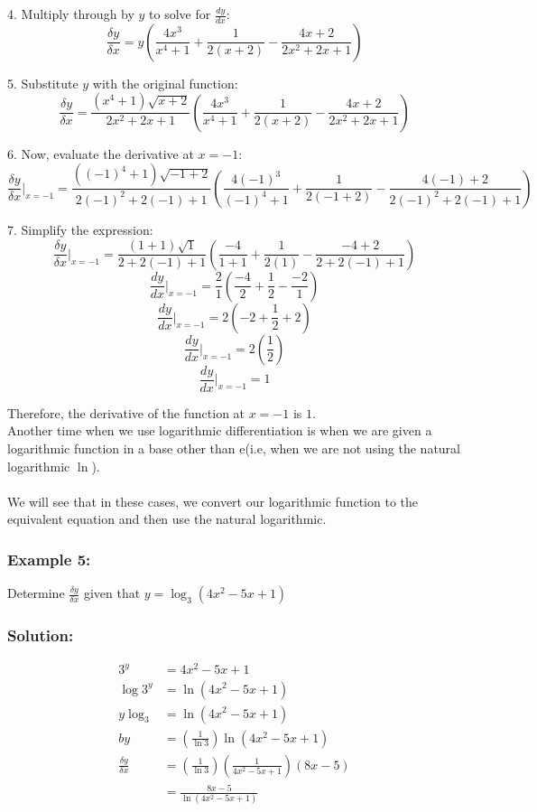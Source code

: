 \documentclass{article}
\begin{document}
4. Multiply through by $y$ to solve for $\frac{dy}{dx}$:
   $$\frac{\delta y}{\delta x} = y\left(\frac{4x^3}{x^4+1} + \frac{1}{2(x+2)} - \frac{4x+2}{2x^2+2x+1}\right)$$

5. Substitute $y$ with the original function:
   $$\frac{\delta y}{\delta x} = \frac{(x^4+1)\sqrt{x+2}}{2x^2+2x+1}\left(\frac{4x^3}{x^4+1} + \frac{1}{2(x+2)} - \frac{4x+2}{2x^2+2x+1}\right)$$

6. Now, evaluate the derivative at $x=-1$:
   $$\frac{\delta y}{\delta x}\bigg|_{x=-1} = \frac{((-1)^4+1)\sqrt{-1+2}}{2(-1)^2+2(-1)+1}\left(\frac{4(-1)^3}{(-1)^4+1} + \frac{1}{2(-1+2)} - \frac{4(-1)+2}{2(-1)^2+2(-1)+1}\right)$$

7. Simplify the expression:
   $$\frac{\delta y}{\delta x}\bigg|_{x=-1} = \frac{(1+1)\sqrt{1}}{2+2(-1)+1}\left(\frac{-4}{1+1} + \frac{1}{2(1)} - \frac{-4+2}{2+2(-1)+1}\right)$$
   $$\frac{dy}{dx}\bigg|_{x=-1} = \frac{2}{1}\left(\frac{-4}{2} + \frac{1}{2} - \frac{-2}{1}\right)$$
   $$\frac{dy}{dx}\bigg|_{x=-1} = 2\left(-2 + \frac{1}{2} + 2\right)$$
   $$\frac{dy}{dx}\bigg|_{x=-1} = 2\left(\frac{1}{2}\right)$$
   $$\frac{dy}{dx}\bigg|_{x=-1} = 1$$

Therefore, the derivative of the function at $x=-1$ is $1$.\\
Another time when we use logarithmic differentiation is when we are given a logarithmic function in a base other than e(i.e, when we are not using the natural logarithmic $\ln$).\\\\
We will see that in these cases, we convert our logarithmic function to the equivalent equation and then use the natural logarithmic.
\subsubsection*{Example 5: }
Determine $\frac{\delta y}{\delta x}$ given that $y=\log_3(4x^2-5x+1)$
\subsubsection*{Solution: }
\begin{align*}
    3^y&=4x^2-5x+1\\
    \log 3^y&=\ln(4x^2-5x+1)\\
    y\log_3&=\ln(4x^2-5x+1)\\b
    y&=\left(\frac{1}{\ln 3}\right)\ln(4x^2-5x+1)\\
    \frac{\delta y}{\delta x}&=\left(\frac{1}{\ln 3}\right)\left(\frac{1}{4x^2-5x+1}\right)(8x-5)\\
    &=\frac{8x-5}{\ln(4x^2-5x+1)}
\end{align*}
 
\end{document}
